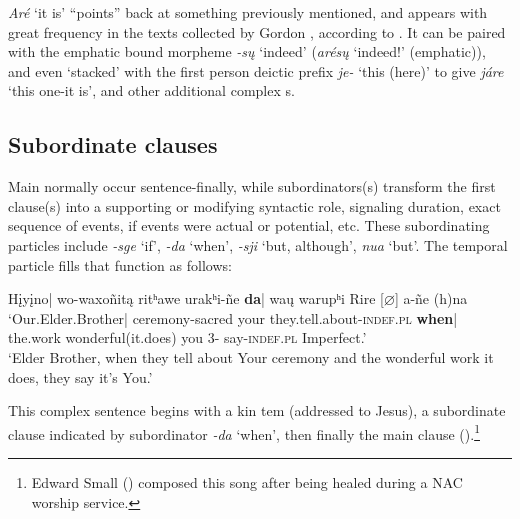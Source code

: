 \documentclass[output=paper]{LSP/langsci}
\begin{document}
\textit{Aré} `it is' ``points'' back at something previously mentioned, and appears with great frequency in the texts collected by Gordon \citet{Marsh1936}, according to \citet{HopkinsFurbee1989}. It can be paired with the emphatic bound morpheme \textit{-s\k{u}} `indeed' (\textit{arés\k{u}} `indeed!' (emphatic)), and even `stacked' with the first person deictic prefix \textit{je-} `this (here)' to give \textit{járe} `this one-it is', and other additional complex s.    

\subsection{Subordinate clauses}
Main  normally occur sentence-finally, while subordinators(s) transform the first clause(s) into a supporting or modifying syntactic role, signaling duration, exact sequence of events, if events were actual or potential, etc. These subordinating particles include \textit{-sge} `if', \textit{-da} `when',  \textit{-sji}  `but, although', \textit{nua} `but'.   The temporal particle fills that function as follows:

\ea \gll  H\k{i}y\k{i}no| wo-waxoñit\k{a}   ritʰawe  urakʰi-ñe   \textbf{da}| wa\k{u}       warupʰi  Rire  [$\varnothing$] a-ñe  (h)na \\ 
`Our.Elder.Brother| 	ceremony-sacred  your  they.tell.about-\textsc{indef.pl}   \textbf{when}| the.work wonderful(it.does)	  you  3- say-\textsc{indef.pl}         Imperfect.' \\
\trans `Elder Brother, when they tell about Your ceremony and the wonderful work it does, they say it's You.'
\z		

This complex sentence begins with a kin tem (addressed to Jesus), a subordinate clause indicated by subordinator \textit{-da} `when', then finally the main clause (\citealt[Song \#16]{Davidson1997}).\footnote{Edward Small () composed this song after being healed during a NAC worship service.}  		
\end{document}
